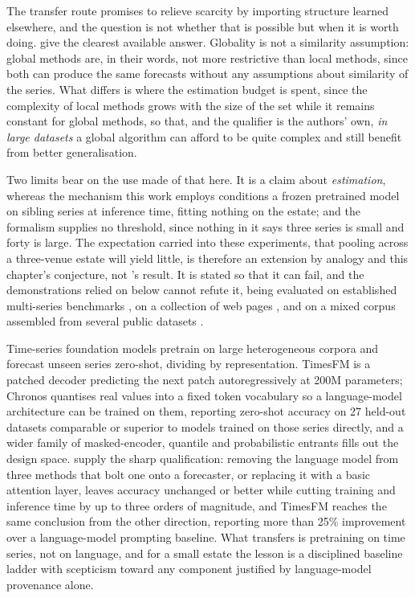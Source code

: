 The transfer route promises to relieve scarcity by importing structure learned
elsewhere, and the question is not whether that is possible but when it is worth
doing. \citet{montero-manso_principles_2021} give the clearest available answer.
Globality is not a similarity assumption: global methods are, in their words, not
more restrictive than local methods, since both can produce the same forecasts
without any assumptions about similarity of the series. What differs is where the
estimation budget is spent, since the complexity of local methods grows with the
size of the set while it remains constant for global methods, so that, and the
qualifier is the authors' own, \emph{in large datasets} a global algorithm can
afford to be quite complex and still benefit from better generalisation.

Two limits bear on the use made of that here. It is a claim about
\emph{estimation}, whereas the mechanism this work employs conditions a frozen
pretrained model on sibling series at inference time, fitting nothing on the
estate; and the formalism supplies no threshold, since nothing in it says three
series is small and forty is large. The expectation carried into these
experiments, that pooling across a three-venue estate will yield little, is
therefore an extension by analogy and this chapter's conjecture, not
\citeauthor{montero-manso_principles_2021}'s result. It is stated so that it can
fail, and the demonstrations relied on below cannot refute it, being evaluated on
established multi-series benchmarks \citep{das_-context_2025}, on a collection of
web pages \citep{zhou_context-driven_2025}, and on a mixed corpus assembled from
several public datasets \citep{liu_generative_2024}.

Time-series foundation models pretrain on large heterogeneous corpora and
forecast unseen series zero-shot, dividing by representation. TimesFM
\citep{das_decoder-only_2024} is a patched decoder predicting the next patch
autoregressively at 200M parameters; Chronos \citep{ansari_chronos_2024}
quantises real values into a fixed token vocabulary so a language-model
architecture can be trained on them, reporting zero-shot accuracy on 27 held-out
datasets comparable or superior to models trained on those series directly, and a
wider family of masked-encoder, quantile and probabilistic entrants
\citep{woo_unified_2024,liu_moirai_2026,goswami_moment_2024,rasul_lag-llama_2024,garza_timegpt-1_2024}
fills out the design space. \citet{tan_are_2024} supply the sharp qualification:
removing the language model from three methods that bolt one onto a forecaster,
or replacing it with a basic attention layer, leaves accuracy unchanged or better
while cutting training and inference time by up to three orders of magnitude, and
TimesFM reaches the same conclusion from the other direction, reporting more than
25\% improvement over a language-model prompting baseline. What transfers is
pretraining on time series, not on language, and for a small estate the lesson is
a disciplined baseline ladder with scepticism toward any component justified by
language-model provenance alone.

